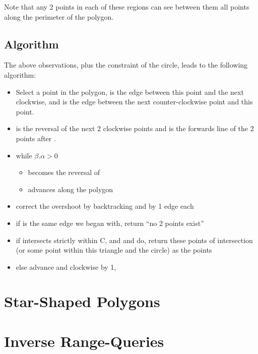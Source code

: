 Note that any 2 points in each of these regions can see between them all points along the perimeter of the polygon.

\subsection{Algorithm}
The above observations, plus the constraint of the circle, leads to the following algorithm:
\begin{itemize}
	\item Select a point in the polygon, \alpha is the edge between this point and the next clockwise, and \omega is the edge between the next counter-clockwise point and this point.
	\item \beta is the reversal of the next 2 clockwise points and \psi is the forwards line of the 2 points after \beta.
	\item while $\beta . \alpha > 0$
		\begin{itemize}
			\item \beta becomes the reversal of \psi
			\item \psi advances along the polygon
		\end{itemize}
	\item correct the overshoot by backtracking \psi and \beta by 1 edge each
	\item if \alpha is the same edge we began with, return ``no 2 points exist''
	\item if \alpha intersects \beta strictly within C, and \psi and \omega do, return these points of intersection (or some point within this triangle and the circle) as the points
	\item else advance \alpha and \omega clockwise by 1, 
\end{itemize}

\section {Star-Shaped Polygons}

\section {Inverse Range-Queries}


